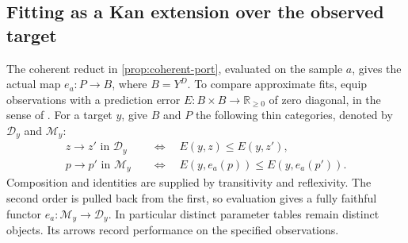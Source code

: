 \documentclass[11pt,a4paper]{article}
\theoremstyle{definition}
\theoremstyle{remark}\newaliascnt{remark}{theorem}
\numberwithin{equation}{section}
\begin{document}
\subsection{Fitting as a Kan extension over the observed target}\label{sec:fit-kan}
The coherent reduct in \cref{prop:coherent-port}, evaluated on the sample \(a\), gives the actual map \(e_a:P\to B\), where \(B=Y^D\). To compare approximate fits, equip observations with a prediction error \(E:B\times B\to\mathbb R_{\ge0}\) of zero diagonal, in the sense of \cite[Definition 3.1]{pugh-kan}. For a target \(y\), give \(B\) and \(P\) the following thin categories, denoted by \(\mathcal D_y\) and \(\mathcal M_y\):
\[
\begin{aligned}
 z\longrightarrow z'\text{ in }\mathcal D_y
       &\quad\Longleftrightarrow\quad E(y,z)\le E(y,z'),\\
 p\longrightarrow p'\text{ in }\mathcal M_y
       &\quad\Longleftrightarrow\quad E(y,e_a(p))\le E(y,e_a(p')).
\end{aligned}
\]
Composition and identities are supplied by transitivity and reflexivity. The second order is pulled back from the first, so evaluation gives a fully faithful functor \(e_a:\mathcal M_y\to\mathcal D_y\). In particular distinct parameter tables remain distinct objects. Its arrows record performance on the specified observations.
\end{document}
